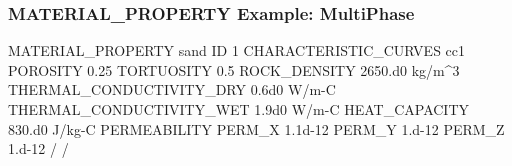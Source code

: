 \begin{frame}[fragile]\frametitle{MATERIAL\_PROPERTY Example: MultiPhase}

\begin{semiverbatim}
MATERIAL_PROPERTY sand
  ID 1
  CHARACTERISTIC_CURVES cc1
  POROSITY 0.25
  TORTUOSITY 0.5
  ROCK_DENSITY 2650.d0 kg/m^3
  THERMAL_CONDUCTIVITY_DRY 0.6d0 W/m-C
  THERMAL_CONDUCTIVITY_WET 1.9d0 W/m-C
  HEAT_CAPACITY 830.d0 J/kg-C
  PERMEABILITY
    PERM_X 1.1d-12
    PERM_Y 1.d-12
    PERM_Z 1.d-12
  /
/
\end{semiverbatim}

\end{frame}
